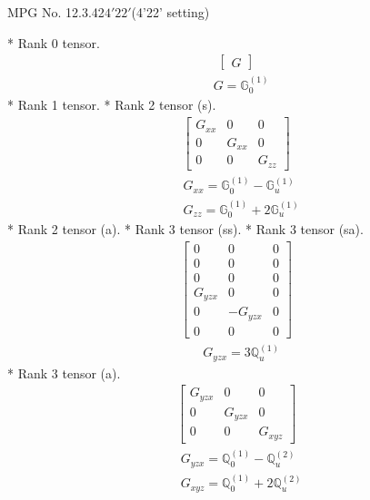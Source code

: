 \documentclass[fleqn,8pt,landscape]{jsarticle}
\begin{document}
\setcounter{MaxMatrixCols}{32}

\renewcommand{\tablename}{Table~}
\renewcommand{\figurename}{Figure~}
\begin{center}
\LARGE
MPG No. 12.3.42\quad$4'22'$\quad(4'22' setting)
\end{center}
* Rank 0 tensor.
\begin{align*}
\begin{bmatrix} G \end{bmatrix}
\end{align*}
\begin{align*}
& G = \mathbb{G}_{0}^{(1)}
\end{align*}
* Rank 1 tensor.
* Rank 2 tensor (s).
\begin{align*}
\begin{bmatrix} G_{xx} & 0 & 0 \\ 0 & G_{xx} & 0 \\ 0 & 0 & G_{zz} \end{bmatrix}
\end{align*}
\begin{align*}
& G_{xx} = \mathbb{G}_{0}^{(1)} - \mathbb{G}_{u}^{(1)} \\
& G_{zz} = \mathbb{G}_{0}^{(1)} + 2 \mathbb{G}_{u}^{(1)}
\end{align*}
* Rank 2 tensor (a).
* Rank 3 tensor (ss).
* Rank 3 tensor (sa).
\begin{align*}
\begin{bmatrix} 0 & 0 & 0 \\ 0 & 0 & 0 \\ 0 & 0 & 0 \\ G_{yzx} & 0 & 0 \\ 0 & - G_{yzx} & 0 \\ 0 & 0 & 0 \end{bmatrix}
\end{align*}
\begin{align*}
& G_{yzx} = 3 \mathbb{Q}_{u}^{(1)}
\end{align*}
* Rank 3 tensor (a).
\begin{align*}
\begin{bmatrix} G_{yzx} & 0 & 0 \\ 0 & G_{yzx} & 0 \\ 0 & 0 & G_{xyz} \end{bmatrix}
\end{align*}
\begin{align*}
& G_{yzx} = \mathbb{Q}_{0}^{(1)} - \mathbb{Q}_{u}^{(2)} \\
& G_{xyz} = \mathbb{Q}_{0}^{(1)} + 2 \mathbb{Q}_{u}^{(2)}
\end{align*}
\end{document}
